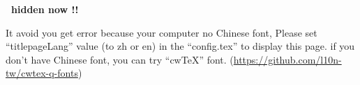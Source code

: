 \documentclass[class=NCU_thesis_en, crop=false]{standalone}
\begin{document}
\fontsize{16}{25}\selectfont
\sffamily %
\begin{titlepage}
    \vspace*{30mm}
    \begin{center}
        {\Huge\textbf{\thispage\ hidden now !!}\par}
    \end{center}
    \vspace*{30mm}
    {\Huge 
    It avoid you get error because your computer no Chinese font, 
    Please set ``titlepageLang'' value (to zh or en) in the ``config.tex'' to display this page.
    if you don't have Chinese font, you can try ``cwTeX'' font. 
    (\url{https://github.com/l10n-tw/cwtex-q-fonts})\par}
    \null\vfill
\end{titlepage}
\restoregeometry
\rmfamily %
\cleardoublepage
\end{document}
